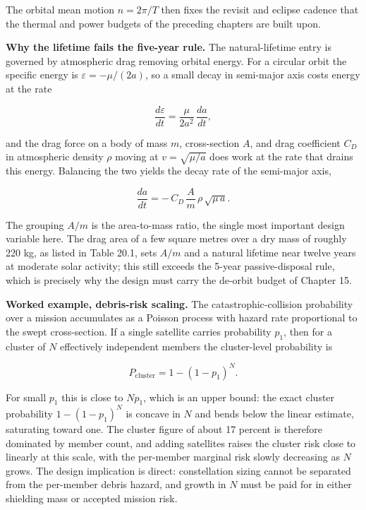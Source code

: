 \documentclass[
  11pt,
  openany,
  oneside]{book}
\begin{document}
The orbital mean motion \(n = 2\pi / T\) then fixes the revisit and
eclipse cadence that the thermal and power budgets of the preceding
chapters are built upon.

\textbf{Why the lifetime fails the five-year rule.} The natural-lifetime
entry is governed by atmospheric drag removing orbital energy. For a
circular orbit the specific energy is \(\varepsilon = -\mu / (2a)\), so
a small decay in semi-major axis costs energy at the rate

\begin{equation}
\frac{d\varepsilon}{dt} = \frac{\mu}{2 a^{2}}\,\frac{da}{dt}, \tag{20.3}
\end{equation}

and the drag force on a body of mass \(m\), cross-section \(A\), and
drag coefficient \(C_D\) in atmospheric density \(\rho\) moving at
\(v = \sqrt{\mu / a}\) does work at the rate that drains this energy.
Balancing the two yields the decay rate of the semi-major axis,

\begin{equation}
\frac{da}{dt} = -\,C_D\,\frac{A}{m}\,\rho\, \sqrt{\mu\, a}. \tag{20.4}
\end{equation}

The grouping \(A/m\) is the area-to-mass ratio, the single most
important design variable here. The drag area of a few square metres
over a dry mass of roughly 220 kg, as listed in Table 20.1, sets \(A/m\)
and a natural lifetime near twelve years at moderate solar activity;
this still exceeds the 5-year passive-disposal rule, which is precisely
why the design must carry the de-orbit budget of Chapter 15.

\textbf{Worked example, debris-risk scaling.} The catastrophic-collision
probability over a mission accumulates as a Poisson process with hazard
rate proportional to the swept cross-section. If a single satellite
carries probability \(p_1\), then for a cluster of \(N\) effectively
independent members the cluster-level probability is

\begin{equation}
P_{\mathrm{cluster}} = 1 - (1 - p_1)^{N}. \tag{20.5}
\end{equation}

For small \(p_1\) this is close to \(N p_1\), which is an upper bound:
the exact cluster probability \(1 - (1 - p_1)^N\) is concave in \(N\)
and bends below the linear estimate, saturating toward one. The cluster
figure of about 17 percent is therefore dominated by member count, and
adding satellites raises the cluster risk close to linearly at this
scale, with the per-member marginal risk slowly decreasing as \(N\)
grows. The design implication is direct: constellation sizing cannot be
separated from the per-member debris hazard, and growth in \(N\) must be
paid for in either shielding mass or accepted mission risk.
\end{document}
